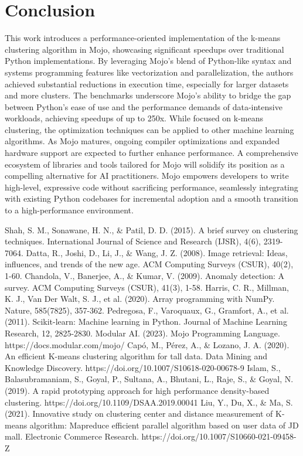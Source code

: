 \documentclass[conference]{IEEEtran}
\begin{document}
\section{Conclusion}
This work introduces a performance-oriented implementation of the k-means clustering algorithm in Mojo, showcasing significant speedups over traditional Python implementations. By leveraging Mojo's blend of Python-like syntax and systems programming features like vectorization and parallelization, the authors achieved substantial reductions in execution time, especially for larger datasets and more clusters. The benchmarks underscore Mojo's ability to bridge the gap between Python's ease of use and the performance demands of data-intensive workloads, achieving speedups of up to 250x. While focused on k-means clustering, the optimization techniques can be applied to other machine learning algorithms. As Mojo matures, ongoing compiler optimizations and expanded hardware support are expected to further enhance performance. A comprehensive ecosystem of libraries and tools tailored for Mojo will solidify its position as a compelling alternative for AI practitioners. Mojo empowers developers to write high-level, expressive code without sacrificing performance, seamlessly integrating with existing Python codebases for incremental adoption and a smooth transition to a high-performance environment.



\begin{thebibliography}{00}
 Shah, S. M., Sonawane, H. N., \& Patil, D. D. (2015). A brief survey on clustering techniques. International Journal of Science and Research (IJSR), 4(6), 2319-7064.
 Datta, R., Joshi, D., Li, J., \& Wang, J. Z. (2008). Image retrieval: Ideas, influences, and trends of the new age. ACM Computing Surveys (CSUR), 40(2), 1-60.
 Chandola, V., Banerjee, A., \& Kumar, V. (2009). Anomaly detection: A survey. ACM Computing Surveys (CSUR), 41(3), 1-58.
 Harris, C. R., Millman, K. J., Van Der Walt, S. J., et al. (2020). Array programming with NumPy. Nature, 585(7825), 357-362.
 Pedregosa, F., Varoquaux, G., Gramfort, A., et al. (2011). Scikit-learn: Machine learning in Python. Journal of Machine Learning Research, 12, 2825-2830.
 Modular AI. (2023). Mojo Programming Language. https://docs.modular.com/mojo/
 Capó, M., Pérez, A., \& Lozano, J. A. (2020). An efficient K-means clustering algorithm for tall data. Data Mining and Knowledge Discovery. https://doi.org/10.1007/S10618-020-00678-9
 Islam, S., Balasubramaniam, S., Goyal, P., Sultana, A., Bhutani, L., Raje, S., \& Goyal, N. (2019). A rapid prototyping approach for high performance density-based clustering. https://doi.org/10.1109/DSAA.2019.00041
 Liu, Y., Du, X., \& Ma, S. (2021). Innovative study on clustering center and distance measurement of K-means algorithm: Mapreduce efficient parallel algorithm based on user data of JD mall. Electronic Commerce Research. https://doi.org/10.1007/S10660-021-09458-Z

\end{thebibliography}
\end{document}
